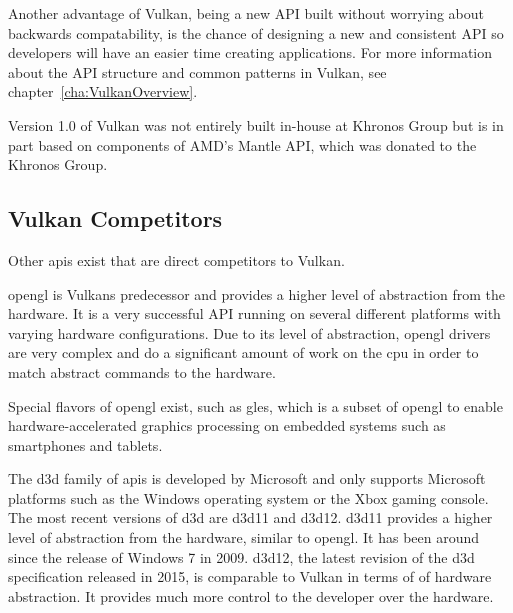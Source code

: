     Another advantage of Vulkan, being a new API built without worrying about backwards compatability, is the chance of designing a new and consistent API so developers will have an easier time creating applications.
    For more information about the API structure and common patterns in Vulkan, see chapter~\ref{cha:VulkanOverview}.

    Version 1.0 of Vulkan was not entirely built in-house at Khronos Group but is in part based on components of AMD's Mantle API, which was donated to the Khronos Group.


    \subsection{Vulkan Competitors}

      Other \glspl{api} exist that are direct competitors to Vulkan.

      \gls{opengl} is Vulkans predecessor and provides a higher level of abstraction from the hardware.
      It is a very successful API running on several different platforms with varying hardware configurations.
      Due to its level of abstraction, \gls{opengl} drivers are very complex and do a significant amount of work on the \gls{cpu} in order to match abstract commands to the hardware.

      Special flavors of \gls{opengl} exist, such as \gls{gles}, which is a subset of \gls{opengl} to enable hardware-accelerated graphics processing on embedded systems such as smartphones and tablets.

      The \gls{d3d} family of \glspl{api} is developed by Microsoft and only supports Microsoft platforms such as the Windows operating system or the Xbox gaming console.
      The most recent versions of \gls{d3d} are \acrlong{d3d11} and \acrlong{d3d12}.
      \acrlong{d3d11} provides a higher level of abstraction from the hardware, similar to \gls{opengl}.
      It has been around since the release of Windows 7 in 2009.
      \acrlong{d3d12}, the latest revision of the \gls{d3d} specification released in 2015, is comparable to Vulkan in terms of of hardware abstraction.
      It provides much more control to the developer over the hardware.



